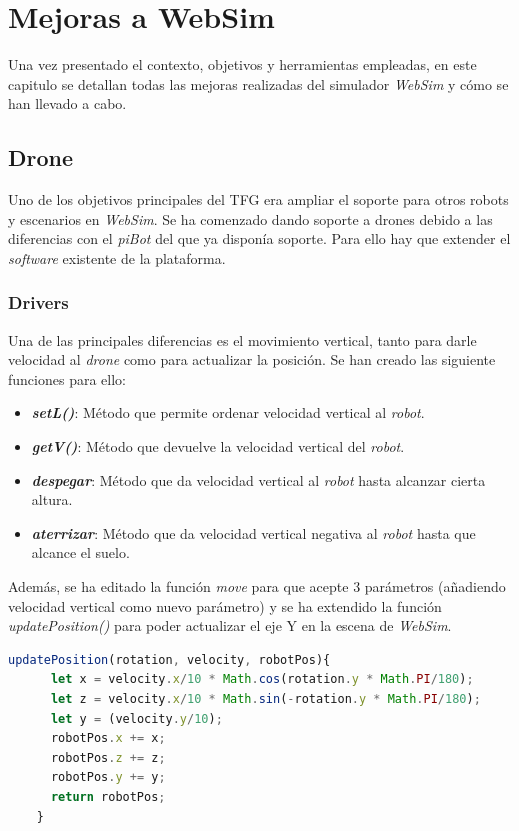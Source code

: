 \chapter{Mejoras a WebSim}
\label{chap:mejoras}
Una vez presentado el contexto, objetivos y herramientas empleadas, en este capitulo se detallan todas las mejoras realizadas del simulador \textit{WebSim} y cómo se han llevado a cabo. 

\section{Drone}
\label{sec:drone}

Uno de los objetivos principales del TFG era ampliar el soporte para otros robots y escenarios en \textit{WebSim}. Se ha comenzado dando soporte a drones debido a las diferencias con el \textit{piBot} del que ya disponía soporte. 
Para ello hay que extender el \textit{software} existente de la plataforma.
\subsection{Drivers}
Una de las principales diferencias es el movimiento vertical, tanto para darle velocidad al \textit{drone} como para actualizar la posición. 
Se han creado las siguiente funciones para ello:
\begin{itemize}
    \item \textit{\textbf{setL()}}: Método que permite ordenar velocidad vertical al \textit{robot}. 
    
    \item \textit{\textbf{getV()}}: Método que devuelve la velocidad vertical del \textit{robot}.
    
    \item \textit{\textit{\textbf{despegar}}}: Método que da velocidad vertical al \textit{robot} hasta alcanzar cierta altura.
    
    \item \textit{\textbf{aterrizar}}: Método que da velocidad vertical negativa al \textit{robot} hasta que alcance el suelo. 
\end{itemize}

Además, se ha editado la función \textit{move} para que acepte 3 parámetros (añadiendo velocidad vertical como nuevo parámetro) y se ha extendido la función \textit{updatePosition()} para poder actualizar el eje Y en la escena de \textit{WebSim}.

\begin{lstlisting}[language=javascript, caption=Función para actualizar la posición del robot en el escenario]
    updatePosition(rotation, velocity, robotPos){
      let x = velocity.x/10 * Math.cos(rotation.y * Math.PI/180);
      let z = velocity.x/10 * Math.sin(-rotation.y * Math.PI/180);
      let y = (velocity.y/10);
      robotPos.x += x;
      robotPos.z += z;
      robotPos.y += y;
      return robotPos;
    }
\end{lstlisting}


